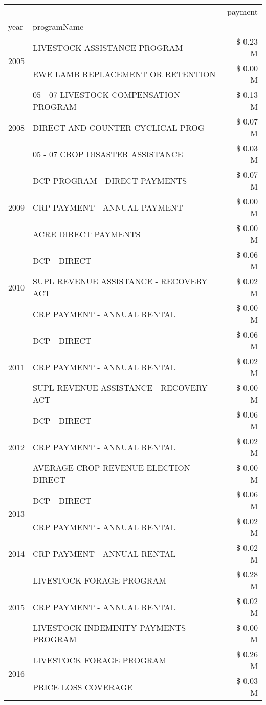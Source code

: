 \begin{tabular}{llr}
\toprule
 &  & payment \\
year & programName &  \\
\midrule
\multirow[t]{2}{*}{2005} & LIVESTOCK ASSISTANCE PROGRAM & \$ 0.23 M \\
 & EWE LAMB REPLACEMENT OR RETENTION & \$ 0.00 M \\
\cline{1-3}
\multirow[t]{3}{*}{2008} & 05 - 07 LIVESTOCK COMPENSATION PROGRAM & \$ 0.13 M \\
 & DIRECT AND COUNTER CYCLICAL PROG & \$ 0.07 M \\
 & 05 - 07 CROP DISASTER ASSISTANCE & \$ 0.03 M \\
\cline{1-3}
\multirow[t]{3}{*}{2009} & DCP PROGRAM - DIRECT PAYMENTS & \$ 0.07 M \\
 & CRP PAYMENT - ANNUAL PAYMENT & \$ 0.00 M \\
 & ACRE DIRECT PAYMENTS & \$ 0.00 M \\
\cline{1-3}
\multirow[t]{3}{*}{2010} & DCP - DIRECT & \$ 0.06 M \\
 & SUPL REVENUE ASSISTANCE - RECOVERY ACT & \$ 0.02 M \\
 & CRP PAYMENT - ANNUAL RENTAL & \$ 0.00 M \\
\cline{1-3}
\multirow[t]{3}{*}{2011} & DCP - DIRECT & \$ 0.06 M \\
 & CRP PAYMENT - ANNUAL RENTAL & \$ 0.02 M \\
 & SUPL REVENUE ASSISTANCE - RECOVERY ACT & \$ 0.00 M \\
\cline{1-3}
\multirow[t]{3}{*}{2012} & DCP - DIRECT & \$ 0.06 M \\
 & CRP PAYMENT - ANNUAL RENTAL & \$ 0.02 M \\
 & AVERAGE CROP REVENUE ELECTION-DIRECT & \$ 0.00 M \\
\cline{1-3}
\multirow[t]{2}{*}{2013} & DCP - DIRECT & \$ 0.06 M \\
 & CRP PAYMENT - ANNUAL RENTAL & \$ 0.02 M \\
\cline{1-3}
2014 & CRP PAYMENT - ANNUAL RENTAL & \$ 0.02 M \\
\cline{1-3}
\multirow[t]{3}{*}{2015} & LIVESTOCK FORAGE PROGRAM & \$ 0.28 M \\
 & CRP PAYMENT - ANNUAL RENTAL & \$ 0.02 M \\
 & LIVESTOCK INDEMINITY PAYMENTS PROGRAM & \$ 0.00 M \\
\cline{1-3}
\multirow[t]{3}{*}{2016} & LIVESTOCK FORAGE PROGRAM & \$ 0.26 M \\
 & PRICE LOSS COVERAGE & \$ 0.03 M \\

\end{tabular}
